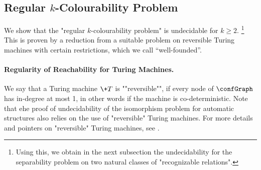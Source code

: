 \subsection{Regular $k$-Colourability Problem}
\label{sec:dichotomy-k-regular-colourability}

We show that the "regular $k$-colourability problem" is undecidable for $k\geq 2$.%
\footnote{
    Using this, we obtain in the next subsection 
    the undecidability for the separability problem on two natural classes of 
    "recognizable relations".
}
This is proven by a reduction from a suitable problem on reversible 
Turing machines with certain restrictions, which we call ``well-founded''.

\paragraph*{Regularity of Reachability for Turing Machines.}

\AP We say that a Turing machine $\+T$ is ""reversible"", if every node of $\confGraph$ has in-degree at most 1, in other words if the machine is co-deterministic.
Note that ehe proof of undecidability of the isomorphism problem for automatic structures 
\cite[\S~5]{KhoussainovNiesRubinStephan2007Automatic}
also relies on the use of "reversible" Turing machines.
For more details and pointers on "reversible" Turing machines,
see \cite[Chapter 5]{Morita2017Reversible}.

